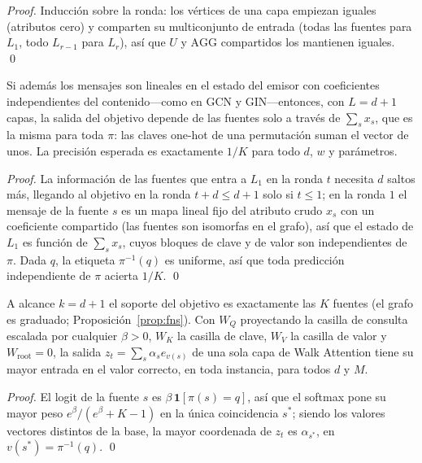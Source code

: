 \documentclass[runningheads]{llncs}
\begin{document}
\begin{proof}
Inducción sobre la ronda: los vértices de una capa empiezan iguales (atributos
cero) y comparten su multiconjunto de entrada (todas las fuentes para $L_1$,
todo $L_{r-1}$ para $L_r$), así que $U$ y $\mathrm{AGG}$ compartidos los
mantienen iguales. \qed
\end{proof}

\begin{proposition}\label{prop:blind}
Si además los mensajes son lineales en el estado del emisor con coeficientes
independientes del contenido---como en GCN y GIN---entonces, con $L=d+1$ capas,
la salida del objetivo depende de las fuentes solo a través de $\sum_s x_s$,
que es la misma para toda $\pi$: las claves one-hot de una permutación suman el
vector de unos. La precisión esperada es exactamente $1/K$ para todo $d$, $w$ y
parámetros.
\end{proposition}

\begin{proof}
La información de las fuentes que entra a $L_1$ en la ronda $t$ necesita $d$
saltos más, llegando al objetivo en la ronda $t+d\le d+1$ solo si $t\le1$; en
la ronda $1$ el mensaje de la fuente $s$ es un mapa lineal fijo del atributo
crudo $x_s$ con un coeficiente compartido (las fuentes son isomorfas en el
grafo), así que el estado de $L_1$ es función de $\sum_s x_s$, cuyos bloques de
clave y de valor son independientes de $\pi$. Dada $q$, la etiqueta
$\pi^{-1}(q)$ es uniforme, así que toda predicción independiente de $\pi$
acierta $1/K$. \qed
\end{proof}

\begin{proposition}\label{prop:wa}
A alcance $k=d+1$ el soporte del objetivo es exactamente las $K$ fuentes (el
grafo es graduado; Proposición~\ref{prop:fns}). Con $W_Q$ proyectando la
casilla de consulta escalada por cualquier $\beta>0$, $W_K$ la casilla de
clave, $W_V$ la casilla de valor y $W_{\!\text{root}}=0$, la salida
$z_t=\sum_s\alpha_s e_{v(s)}$ de una sola capa de Walk Attention tiene su mayor
entrada en el valor correcto, en toda instancia, para todos $d$ y $M$.
\end{proposition}

\begin{proof}
El logit de la fuente $s$ es $\beta\,\mathbf{1}[\pi(s)=q]$, así que el softmax
pone su mayor peso $e^{\beta}/(e^{\beta}+K-1)$ en la única coincidencia
$s^\ast$; siendo los valores vectores distintos de la base, la mayor coordenada
de $z_t$ es $\alpha_{s^\ast}$, en $v(s^\ast)=\pi^{-1}(q)$. \qed
\end{proof}
\end{document}
